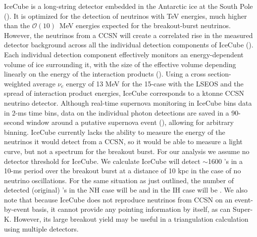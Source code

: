 IceCube is a long-string detector embedded in the Antarctic ice at the
South Pole (\citealp{achterbergetal2006,abbasi2010}). It
is optimized for the detection of neutrinos with TeV energies, much
higher than the $\mathcal{O}(10)$~MeV energies expected for the
breakout-burst neutrinos. 
However, the
neutrinos from a CCSN will create a correlated rise in the measured
detector background across all the individual detection components of IceCube
(\citealp{pryoretal1988,halzenetal1996}).  
Each individual detection component effectively monitors 
an energy-dependent volume of ice surrounding it, with the 
size of the effective volume depending linearly on the 
energy of the interaction products (\citealt{abbasietal2011}).  
Using a cross section-weighted average $\nu_e$ energy of 13 MeV 
for the 15-\Msol case with the LSEOS and the spread of interaction 
product energies, IceCube corresponds to a  ktonne 
CCSN neutrino detector.
Although real-time supernova monitoring in IceCube bins data 
in 2-ms time bins, data on the individual photon detections 
are saved in a 90-second window around a putative supernova 
event (\citealt{aartsenetal2013}), allowing for arbitrary binning.
IceCube
currently lacks the ability to measure the energy of the neutrinos it
would detect from a CCSN, so it would be able to measure a light curve, but
not a spectrum for the breakout burst.  For our analysis we assume no
detector threshold for IceCube.  We calculate 
IceCube  will detect 
$\sim$1600 \nue's in a 10-ms period over the
breakout burst at a distance of 10 kpc in the case of no neutrino
oscillations.  For the same situation as just outlined, the number of
detected (original) \nue's in the NH case will be  and in the IH
case will be .  We also note that because
IceCube does not reproduce neutrinos from CCSN on an event-by-event
basis, it cannot provide any pointing information by itself, as can
Super-K.  However, its large breakout yield may be useful
in a triangulation calculation using multiple detectors.

